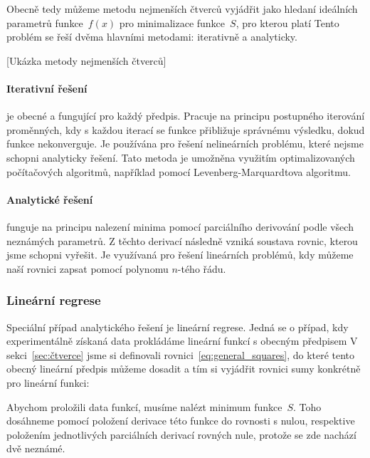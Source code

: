 Obecně tedy můžeme metodu nejmenších čtverců vyjádřit jako hledaní ideálních 
parametrů funkce~$f(x)$ pro minimalizace funkce~$S$, pro kterou platí
Tento problém se řeší dvěma hlavními metodami: iterativně a analyticky.

[Ukázka metody nejmenších čtverců]

\paragraph{Iterativní řešení} je obecné a fungující pro každý předpis. Pracuje
na principu postupného iterování proměnných, kdy s každou iterací se funkce
přibližuje správnému výsledku, dokud funkce nekonverguje. Je používána pro
řešení nelineárních problému, které nejsme schopni analyticky řešení. Tato
metoda je umožněna využitím optimalizovaných počítačových algoritmů, například
pomocí Levenberg-Marquardtova algoritmu.

\paragraph{Analytické řešení} funguje na principu nalezení minima pomocí
parciálního derivování podle všech neznámých parametrů. Z těchto derivací
následně vzniká soustava rovnic, kterou jsme schopni vyřešit. Je využívaná pro
řešení lineárních problémů, kdy můžeme naší rovnici zapsat pomocí polynomu
$n$-tého řádu.


\subsubsection{Lineární regrese}
Speciální případ analytického řešení je lineární regrese. Jedná se o případ,
kdy experimentálně získaná data prokládáme lineární funkcí s obecným předpisem
V sekci~\ref{sec:čtverce} jsme si definovali rovnici~\eqref{eq:general_squares},
do které tento obecný lineární předpis můžeme dosadit a tím si vyjádřit rovnici
sumy konkrétně pro lineární funkci:

Abychom proložili data funkcí, musíme nalézt minimum funkce~$S$. Toho dosáhneme
pomocí položení derivace této funkce do rovnosti s nulou, respektive položením
jednotlivých parciálních derivací rovných nule, protože se zde nachází dvě
neznámé. 


